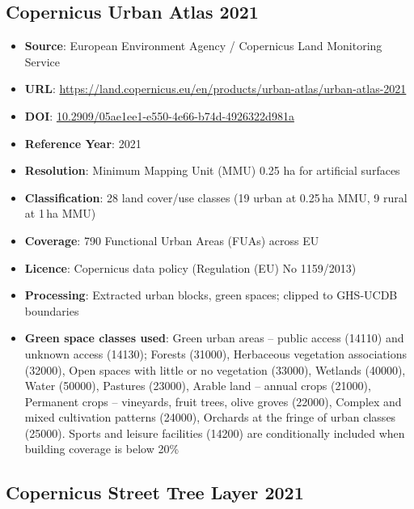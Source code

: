 \subsection{Copernicus Urban Atlas 2021}

\begin{itemize}
  \item \textbf{Source}: European Environment Agency / Copernicus Land Monitoring Service
  \item \textbf{URL}: \url{https://land.copernicus.eu/en/products/urban-atlas/urban-atlas-2021}
  \item \textbf{DOI}: \href{https://doi.org/10.2909/05ae1ee1-e550-4e66-b74d-4926322d981a}{10.2909/05ae1ee1-e550-4e66-b74d-4926322d981a}
  \item \textbf{Reference Year}: 2021
  \item \textbf{Resolution}: Minimum Mapping Unit (MMU) 0.25 ha for artificial surfaces
  \item \textbf{Classification}: 28 land cover/use classes (19 urban at 0.25\,ha MMU, 9 rural at 1\,ha MMU)
  \item \textbf{Coverage}: 790 Functional Urban Areas (FUAs) across EU
  \item \textbf{Licence}: Copernicus data policy (Regulation (EU) No 1159/2013)
  \item \textbf{Processing}: Extracted urban blocks, green spaces; clipped to GHS-UCDB boundaries
  \item \textbf{Green space classes used}: Green urban areas -- public access (14110) and unknown access (14130); Forests (31000), Herbaceous vegetation associations (32000), Open spaces with little or no vegetation (33000), Wetlands (40000), Water (50000), Pastures (23000), Arable land -- annual crops (21000), Permanent crops -- vineyards, fruit trees, olive groves (22000), Complex and mixed cultivation patterns (24000), Orchards at the fringe of urban classes (25000). Sports and leisure facilities (14200) are conditionally included when building coverage is below 20\%
\end{itemize}

\subsection{Copernicus Street Tree Layer 2021}

